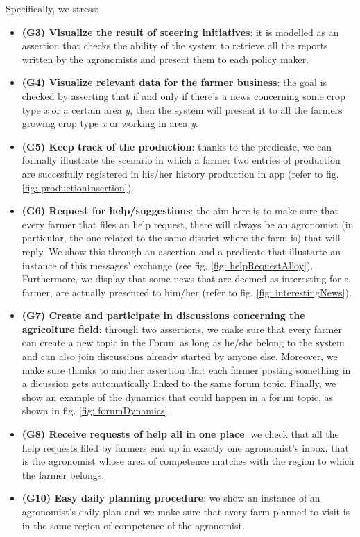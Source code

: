 \documentclass[table, 12pt]{article}
\begin{document}
Specifically, we stress:
\begin{itemize}
    \item \textbf{(G3) Visualize the result of steering initiatives}: it is modelled as an assertion that checks the ability of the system to retrieve all the reports written by the agronomists and present them to each policy maker.
    \item \textbf{(G4) Visualize relevant data for the farmer business}: the goal is checked by asserting that if and only if there's a news concerning some crop type \textit{x} or a certain area \textit{y}, then the system will present it to all the farmers growing crop type \textit{x} or working in area \textit{y}.
    \item \textbf{(G5) Keep track of the production}: thanks to the predicate, we can formally illustrate the scenario in which a farmer two entries of production are succesfully registered in his/her history production in app (refer to fig. \ref{fig: productionInsertion}).
    \item \textbf{(G6) Request for help/suggestions}: the aim here is to make sure that every farmer that files an help request, there will always be an agronomist (in particular, the one related to the same district where the farm is) that will reply. We show this through an assertion and a predicate that illustarte an instance of this messages' exchange (see fig. \ref{fig: helpRequestAlloy}). Furthermore, we display that some news that are deemed as interesting for a farmer, are actually presented to him/her (refer to fig. \ref{fig: interestingNews}).
    \item \textbf{(G7) Create and participate in discussions concerning the agricolture field}: through two assertions, we make sure that every farmer can create a new topic in the Forum as long as he/she belong to the system and can also join discussions already started by anyone else. Moreover, we make sure thanks to another assertion that each farmer posting something in a dicussion gets automatically linked to the same forum topic. Finally, we show an example of the dynamics that could happen in a forum topic, as shown in fig. \ref{fig: forumDynamics}.
    \item \textbf{(G8) Receive requests of help all in one place}: we check that all the help requests filed by farmers end up in exactly one agronomist's inbox, that is the agronomist whose area of competence matches with the region to which the farmer belongs.
    \item \textbf{(G10) Easy daily planning procedure}: we show an instance of an agronomist's daily plan and we make sure that every farm planned to visit is in the same region of competence of the agronomist.
\end{itemize}
\end{document}
